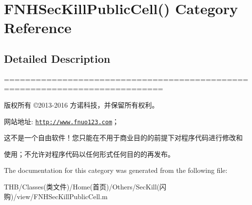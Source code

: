 \hypertarget{category_f_n_h_sec_kill_public_cell_07_08}{}\section{F\+N\+H\+Sec\+Kill\+Public\+Cell() Category Reference}
\label{category_f_n_h_sec_kill_public_cell_07_08}


\subsection{Detailed Description}
============================================================================

版权所有 ©2013-\/2016 方诺科技，并保留所有权利。

网站地址\+: \href{http://www.fnuo123.com}{\tt http\+://www.\+fnuo123.\+com}； 



这不是一个自由软件！您只能在不用于商业目的的前提下对程序代码进行修改和

使用；不允许对程序代码以任何形式任何目的的再发布。 

 

The documentation for this category was generated from the following file\+:\begin{DoxyCompactItemize}
\item 
T\+H\+B/\+Classes(类文件)/\+Home(首页)/\+Others/\+Sec\+Kill(闪购)/view/F\+N\+H\+Sec\+Kill\+Public\+Cell.\+m\end{DoxyCompactItemize}
